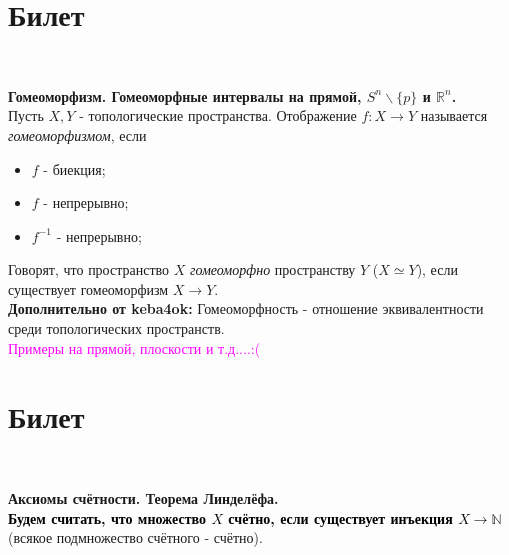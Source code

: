\documentclass[a4paper,100pt]{article}
\theoremstyle{indented}
\begin{document}
\section{Билет} \

\medskip

\textbf{Гомеоморфизм. Гомеоморфные интервалы на прямой, $S^n \backslash \{p\}$ и $\mathbb{R}^n$.}\\

Пусть $X, Y$ - топологические пространства. Отображение $f: X \rightarrow Y $ называется \textit{гомеоморфизмом}, если 
\begin{itemize}
    \item $f$ - биекция;
    \item $f$ - непрерывно;
    \item $f^{-1}$ - непрерывно;
\end{itemize}

Говорят, что пространство $X$ \textit{гомеоморфно} пространству $Y$ ($X \simeq Y$), если существует гомеоморфизм $X \rightarrow Y$. \\

\textbf{Дополнительно от keba4ok:} Гомеоморфность - отношение эквивалентности среди топологических пространств. \\

\textcolor{magenta}{Примеры на прямой, плоскости и т.д....:(}



\section{Билет} \

\medskip

\textbf{Аксиомы счётности. Теорема Линделёфа.}\\
    
    \textbf{\textcolor{black}{Будем считать, что множество $X$ счётно, если существует инъекция $X \rightarrow \mathbb N$}} (всякое подмножество счётного - счётно).
    
\end{document}
